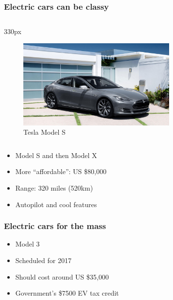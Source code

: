 {
\logo{}
\begin{frame}
\frametitle{Electric cars can be classy}
\begin{center}
\begin{columns}
\begin{column}{330px}
{
    \begin{figure}[h!]
        \centering
        \includegraphics[width=300px]
            {images/tesla-model-s.jpg}
        \vspace{-0.5em}
        \caption{Tesla Model S}
    \end{figure}
}
\end{column}
\end{columns}
\end{center}
\end{frame}
}

\begin{frame}
\begin{itemize}
    \itemsep1.5em
    \item Model S and then Model X
    \item More ``affordable'': US \$80,000
    \item Range: 320 miles (520km)
    \item Autopilot and cool features
\end{itemize}
\end{frame}

\begin{frame}
\frametitle{Electric cars for the mass}
\begin{itemize}
    \itemsep1.5em
    \item Model 3
    \item Scheduled for 2017
    \item Should cost around US \$35,000
    \item Government's \$7500 EV tax credit
\end{itemize}
\end{frame}
